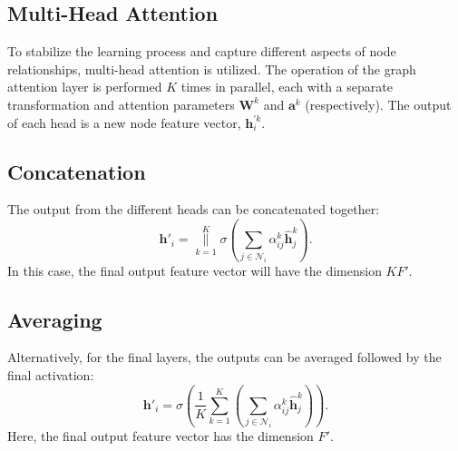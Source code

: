 \documentclass[11pt]{article}
\begin{document}
	\subsection{Multi-Head Attention}
	To stabilize the learning process and capture different aspects of node relationships, multi-head attention is utilized.  The operation of the graph attention layer is performed $K$ times in parallel, each with a separate transformation and attention parameters $\mathbf{W}^k$ and $\mathbf{a}^k$ (respectively). The output of each head is a new node feature vector, $\mathbf{h}_i^{'k}$.
	
	\subsection{Concatenation}
	The output from the different heads can be concatenated together:
	\begin{equation}
		\mathbf{h}'_i = \underset{k=1}{\overset{K}{\parallel}} \sigma \left( \sum_{j \in \mathcal{N}_i} \alpha_{ij}^k \mathbf{\hat{h}}_j^k \right).
	\end{equation}
	In this case, the final output feature vector will have the dimension $KF'$.
	
	\subsection{Averaging}
	Alternatively, for the final layers, the outputs can be averaged followed by the final activation:
	\begin{equation}
		\mathbf{h}'_i = \sigma\left(\frac{1}{K} \sum_{k=1}^K \left( \sum_{j \in \mathcal{N}_i} \alpha_{ij}^k \mathbf{\hat{h}}_j^k \right) \right).
	\end{equation}
	Here, the final output feature vector has the dimension $F'$.
\end{document}
